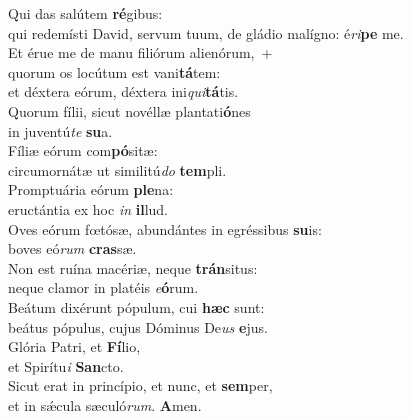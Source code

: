 \evenverse Qui das salútem \textbf{ré}gibus:~\*\\
\evenverse qui redemísti David, servum tuum, de gládio malígno: é\textit{ri}\textbf{pe} me.\\
\oddverse Et érue me de manu filiórum alienórum,~+\\
\oddverse  quorum os locútum est vani\textbf{tá}tem:~\*\\
\oddverse et déxtera eórum, déxtera ini\textit{qui}\textbf{tá}tis.\\
\evenverse Quorum fílii, sicut novéllæ plantati\textbf{ó}nes~\*\\
\evenverse in juventú\textit{te} \textbf{su}a.\\
\oddverse Fíliæ eórum com\textbf{pó}sitæ:~\*\\
\oddverse circumornátæ ut similitú\textit{do} \textbf{tem}pli.\\
\evenverse Promptuária eórum \textbf{ple}na:~\*\\
\evenverse eructántia ex hoc \textit{in} \textbf{il}lud.\\
\oddverse Oves eórum fœtósæ, abundántes in egréssibus \textbf{su}is:~\*\\
\oddverse boves eó\textit{rum} \textbf{cras}sæ.\\
\evenverse Non est ruína macériæ, neque \textbf{trán}situs:~\*\\
\evenverse neque clamor in platéis \textit{e}\textbf{ó}rum.\\
\oddverse Beátum dixérunt pópulum, cui \textbf{hæc} sunt:~\*\\
\oddverse beátus pópulus, cujus Dóminus De\textit{us} \textbf{e}jus.\\
\evenverse Glória Patri, et \textbf{Fí}lio,~\*\\
\evenverse et Spirítu\textit{i} \textbf{San}cto.\\
\oddverse Sicut erat in princípio, et nunc, et \textbf{sem}per,~\*\\
\oddverse et in sǽcula sæculó\textit{rum}. \textbf{A}men.\\
